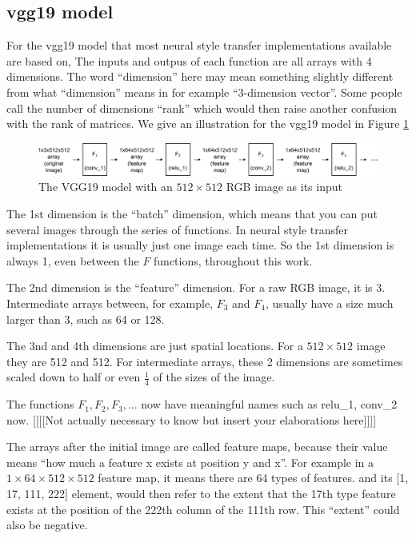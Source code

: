\documentclass[runningheads]{llncs}
\begin{document}
\subsection{vgg19 model}
For the vgg19 model that most neural style transfer implementations available are based on,
The inputs and outpus of each function are all arrays with 4 dimensions.
The word ``dimension'' here may mean something slightly different from what ``dimension'' means in
for example ``$3$-dimension vector''. 
Some people call the number of dimensions ``rank'' which would then raise another confusion with the rank of matrices.
We give an illustration for the vgg19 model in Figure \ref{vgg512}
\begin{figure}
\center
\includegraphics[width=\textwidth]{vgg512.pdf}
\caption{The VGG19 model with an $512\times512$ RGB image as its input \label{vgg512}}
\end{figure}

The 1st dimension is the ``batch'' dimension, which means that you can put several images through the
series of functions.
In neural style transfer implementations it is usually just one image each time.
So the 1st dimension is always 1, even between the $F$ functions, throughout this work.

The 2nd dimension is the ``feature'' dimension. For a raw RGB image, it is 3.
Intermediate arrays between, for example, $F_3$ and $F_4$, usually 
have a size much larger than 3, such as 64 or 128.

The 3nd and 4th dimensions are just spatial locations. 
For a $512\times512$ image they are 512 and 512. 
For intermediate arrays, these 2 dimensions are sometimes scaled down
to half or even $\frac{1}{4}$ of the sizes of the image.

The functions $F_1,F_2,F_3,...$ now have meaningful names such as relu\_1, conv\_2 now.
[[[[Not actually necessary to know but insert your elaborations here]]]]

The arrays after the initial image are called feature maps, because their value means
``how much a feature x exists at position y and x''.
For example in a $1\times64\times512\times512$ feature map, it means there are 64 types of features.
and its [1, 17, 111, 222] element, would then refer to the extent that the 17th type feature exists
at the position of the 222th column of the 111th row. This ``extent'' could also be negative.
\end{document}
